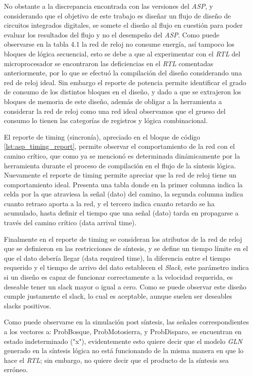 No obstante a la discrepancia encontrada con las versiones del \textit{ASP}, y considerando que el objetivo de este trabajo es diseñar un flujo de diseño de circuitos integrados digitales, se somete el diseño al flujo en cuestión para poder evaluar los resultados del flujo y no el desempeño del \textit{ASP}.
Como puede observarse en la tabla 4.1 la red de reloj no consume energía, así tampoco los bloques de lógica secuencial, esto se debe a que al experimentar con el \textit{RTL} del microprocesador se encontraron las deficiencias en el \textit{RTL} comentadas anteriormente, por lo que se efectuó la compilación del diseño considerando una red de reloj ideal. Sin embargo el reporte de potencia permite identificar el grado de consumo de los distintos bloques en el diseño, y dado a que se extrajeron los bloques de memoria de este diseño, además de obligar a la herramienta a considerar la red de reloj como una red ideal observamos que el grueso del consumo lo tienen las categorías de registros y lógica combinacional.

El reporte de timing (sincronía), apreciado en el bloque de código \ref{lst:asp_timing_report}, permite observar el comportamiento de la red con el camino crítico, que como ya se mencionó es determinada dinámicamente por la herramienta durante el proceso de compilación en el flujo de la síntesis lógica. Nuevamente el reporte de timing permite apreciar que la red de reloj tiene un comportamiento ideal. Presenta una tabla donde en la primer columna indica la celda por la que atraviesa la señal (dato) del camino, la segunda columna indica cuanto retraso aporta a la red, y el tercero indica cuanto retardo se ha acumulado, hasta definir el tiempo que una señal (dato) tarda en propagarse a través del camino crítico (data arrival time).

Finalmente en el reporte de timing se consideran los atributos de la red de reloj que se definieron en las restricciones de síntesis, y se define un tiempo límite en el que el dato debería llegar (data required time), la diferencia entre el tiempo requerido y el tiempo de arrivo del dato establecen el \textit{Slack}, este parámetro indica si un diseño es capaz de funcionar correctamente a la velocidad requerida, es deseable tener un slack mayor o igual a cero. Como se puede observar este diseño cumple justamente el slack, lo cual es aceptable, aunque suelen ser deseables slacks positivos.

Como puede observarse en la simulación post síntesis, las señales correspondientes a los vectores a:
ProbBosque, ProbMotosierra, y ProbDisparo, se encuentran en estado indeterminado ("x"), evidentemente esto quiere decir que el modelo \textit{GLN} generado en la síntesis lógica no está funcionando de la misma manera en que lo hace el \textit{RTL}; sin embargo, no quiere decir que el producto de la síntesis sea erróneo.

